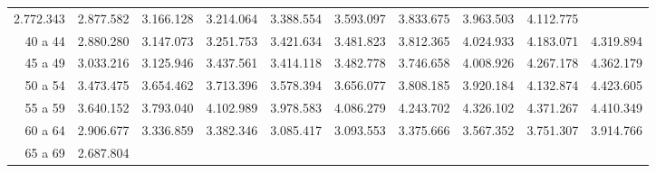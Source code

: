\begin{tabular}{llllllllll}
  \multicolumn{1}{|r}{2.772.343} &
  \multicolumn{1}{r}{2.877.582} &
  \multicolumn{1}{r}{3.166.128} &
  \multicolumn{1}{r}{3.214.064} &
  \multicolumn{1}{r}{3.388.554} &
  \multicolumn{1}{r}{3.593.097} &
  \multicolumn{1}{r}{3.833.675} &
  \multicolumn{1}{r}{3.963.503} &
  \multicolumn{1}{r}{4.112.775} \\
\multicolumn{1}{r}{40 a 44\hspace{1em}} &
  \multicolumn{1}{|r}{2.880.280} &
  \multicolumn{1}{r}{3.147.073} &
  \multicolumn{1}{r}{3.251.753} &
  \multicolumn{1}{r}{3.421.634} &
  \multicolumn{1}{r}{3.481.823} &
  \multicolumn{1}{r}{3.812.365} &
  \multicolumn{1}{r}{4.024.933} &
  \multicolumn{1}{r}{4.183.071} &
  \multicolumn{1}{r}{4.319.894} \\
\multicolumn{1}{r}{45 a 49\hspace{1em}} &
  \multicolumn{1}{|r}{3.033.216} &
  \multicolumn{1}{r}{3.125.946} &
  \multicolumn{1}{r}{3.437.561} &
  \multicolumn{1}{r}{3.414.118} &
  \multicolumn{1}{r}{3.482.778} &
  \multicolumn{1}{r}{3.746.658} &
  \multicolumn{1}{r}{4.008.926} &
  \multicolumn{1}{r}{4.267.178} &
  \multicolumn{1}{r}{4.362.179} \\
\multicolumn{1}{r}{50 a 54\hspace{1em}} &
  \multicolumn{1}{|r}{3.473.475} &
  \multicolumn{1}{r}{3.654.462} &
  \multicolumn{1}{r}{3.713.396} &
  \multicolumn{1}{r}{3.578.394} &
  \multicolumn{1}{r}{3.656.077} &
  \multicolumn{1}{r}{3.808.185} &
  \multicolumn{1}{r}{3.920.184} &
  \multicolumn{1}{r}{4.132.874} &
  \multicolumn{1}{r}{4.423.605} \\
\multicolumn{1}{r}{55 a 59\hspace{1em}} &
  \multicolumn{1}{|r}{3.640.152} &
  \multicolumn{1}{r}{3.793.040} &
  \multicolumn{1}{r}{4.102.989} &
  \multicolumn{1}{r}{3.978.583} &
  \multicolumn{1}{r}{4.086.279} &
  \multicolumn{1}{r}{4.243.702} &
  \multicolumn{1}{r}{4.326.102} &
  \multicolumn{1}{r}{4.371.267} &
  \multicolumn{1}{r}{4.410.349} \\
\multicolumn{1}{r}{60 a 64\hspace{1em}} &
  \multicolumn{1}{|r}{2.906.677} &
  \multicolumn{1}{r}{3.336.859} &
  \multicolumn{1}{r}{3.382.346} &
  \multicolumn{1}{r}{3.085.417} &
  \multicolumn{1}{r}{3.093.553} &
  \multicolumn{1}{r}{3.375.666} &
  \multicolumn{1}{r}{3.567.352} &
  \multicolumn{1}{r}{3.751.307} &
  \multicolumn{1}{r}{3.914.766} \\
\multicolumn{1}{r}{65 a 69\hspace{1em}} &
  \multicolumn{1}{|r}{2.687.804} &

\end{tabular}

